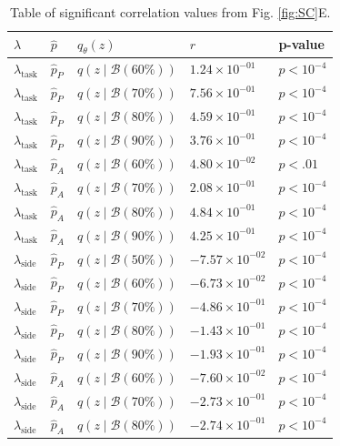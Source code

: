 \documentclass[11pt]{article}
\begin{document}
\begin{table}[h]
\begin{tabular}{l|l|l|l|l}
$\lambda$  & $\hat{p}$ & $q_\theta(z)$ & $r$ & p-value \\ \hline
$\lambda_{\text{task}}$ & $\hat{p}_P$ & $q(z \mid \mathcal{B}(60\%))$ & $1.24 \times 10^{-01}$ & $p<10^{-4}$  \\ \hline
$\lambda_{\text{task}}$ & $\hat{p}_P$ & $q(z \mid \mathcal{B}(70\%))$ & $7.56 \times 10^{-01}$ & $p<10^{-4}$ \\ \hline
$\lambda_{\text{task}}$ & $\hat{p}_P$ & $q(z \mid \mathcal{B}(80\%))$ & $4.59 \times 10^{-01}$ & $p<10^{-4}$  \\ \hline
$\lambda_{\text{task}}$ & $\hat{p}_P$ & $q(z \mid \mathcal{B}(90\%))$ & $3.76 \times 10^{-01}$ & $p<10^{-4}$  \\ \hline

$\lambda_{\text{task}}$ & $\hat{p}_A$ & $q(z \mid \mathcal{B}(60\%))$ & $4.80 \times 10^{-02}$ & $p<.01$ \\ \hline
$\lambda_{\text{task}}$ & $\hat{p}_A$ & $q(z \mid \mathcal{B}(70\%))$ & $2.08 \times 10^{-01}$ & $p<10^{-4}$  \\ \hline
$\lambda_{\text{task}}$ & $\hat{p}_A$ & $q(z \mid \mathcal{B}(80\%))$ & $4.84 \times 10^{-01}$ & $p<10^{-4}$  \\ \hline
$\lambda_{\text{task}}$ & $\hat{p}_A$ & $q(z \mid \mathcal{B}(90\%))$ & $4.25 \times 10^{-01}$ & $p<10^{-4}$  \\ \hline

$\lambda_{\text{side}}$ & $\hat{p}_P$ & $q(z \mid \mathcal{B}(50\%))$ & $-7.57 \times 10^{-02}$ & $p<10^{-4}$  \\ \hline
$\lambda_{\text{side}}$ & $\hat{p}_P$ & $q(z \mid \mathcal{B}(60\%))$ & $-6.73 \times 10^{-02}$ & $p<10^{-4}$  \\ \hline
$\lambda_{\text{side}}$ & $\hat{p}_P$ & $q(z \mid \mathcal{B}(70\%))$ & $-4.86 \times 10^{-01}$ & $p<10^{-4}$  \\ \hline
$\lambda_{\text{side}}$ & $\hat{p}_P$ & $q(z \mid \mathcal{B}(80\%))$ & $-1.43 \times 10^{-01}$ & $p<10^{-4}$  \\ \hline
$\lambda_{\text{side}}$ & $\hat{p}_P$ & $q(z \mid \mathcal{B}(90\%))$ & $-1.93 \times 10^{-01}$ & $p<10^{-4}$  \\ \hline

$\lambda_{\text{side}}$ & $\hat{p}_A$ & $q(z \mid \mathcal{B}(60\%))$ & $-7.60 \times 10^{-02}$ & $p<10^{-4}$  \\ \hline
$\lambda_{\text{side}}$ & $\hat{p}_A$ & $q(z \mid \mathcal{B}(70\%))$ & $-2.73 \times 10^{-01}$ & $p<10^{-4}$  \\ \hline
$\lambda_{\text{side}}$ & $\hat{p}_A$ & $q(z \mid \mathcal{B}(80\%))$ & $-2.74 \times 10^{-01}$ & $p<10^{-4}$  \\ \hline
\end{tabular}
\caption{Table of significant correlation values from Fig. \ref{fig:SC}E.}
\end{table}
\end{document}
